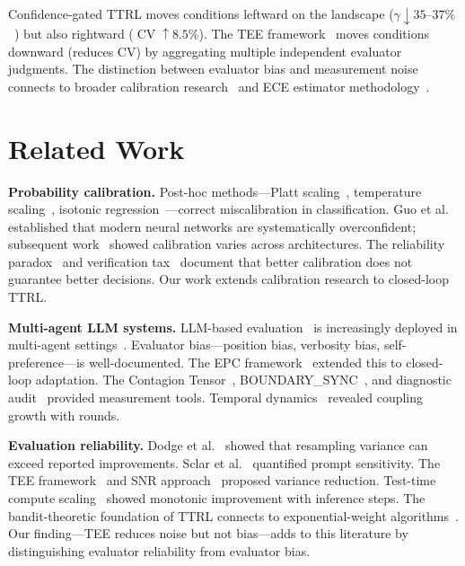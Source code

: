 \documentclass[11pt]{article}
\DeclareMathOperator{\CV}{CV}
\begin{document}
Confidence-gated TTRL moves conditions leftward on the landscape ($\gamma \downarrow 35$--$37\%$~\cite{liu2026caleffects}) but also rightward ($\CV \uparrow 8.5\%$). The TEE framework~\cite{messing2026tee} moves conditions downward (reduces CV) by aggregating multiple independent evaluator judgments. The distinction between evaluator bias and measurement noise connects to broader calibration research~\cite{guo2017calibration,niculescu2005predicting,kull2017temperature} and ECE estimator methodology~\cite{kumar2019verified,nixon2019measuring,roelofs2022mitigating}.

\section{Related Work}

\textbf{Probability calibration.} Post-hoc methods---Platt scaling~\cite{platt1999probabilistic}, temperature scaling~\cite{kull2017temperature}, isotonic regression~\cite{niculescu2005predicting}---correct miscalibration in classification. Guo et al.~\cite{guo2017calibration} established that modern neural networks are systematically overconfident; subsequent work~\cite{minderer2021revisiting,wang2021revisiting} showed calibration varies across architectures. The reliability paradox~\cite{he2026paradox} and verification tax~\cite{mills2026verification} document that better calibration does not guarantee better decisions. Our work extends calibration research to closed-loop TTRL.

\textbf{Multi-agent LLM systems.} LLM-based evaluation~\cite{zheng2023judging,chiang2024chatbot} is increasingly deployed in multi-agent settings~\cite{li2023camel,wu2024autogen}. Evaluator bias---position bias, verbosity bias, self-preference---is well-documented. The EPC framework~\cite{liu2026epc} extended this to closed-loop adaptation. The Contagion Tensor~\cite{liu2026tensor}, BOUNDARY\_SYNC~\cite{liu2026boundarysync}, and diagnostic audit~\cite{liu2026audit} provided measurement tools. Temporal dynamics~\cite{liu2026temporal} revealed coupling growth with rounds.

\textbf{Evaluation reliability.} Dodge et al.~\cite{dodge2019reproducibility} showed that resampling variance can exceed reported improvements. Sclar et al.~\cite{sclar2024quantifying} quantified prompt sensitivity. The TEE framework~\cite{messing2026tee} and SNR approach~\cite{heineman2025snr} proposed variance reduction. Test-time compute scaling~\cite{snell2024scaling} showed monotonic improvement with inference steps. The bandit-theoretic foundation of TTRL connects to exponential-weight algorithms~\cite{bubeck2012regret}. Our finding---TEE reduces noise but not bias---adds to this literature by distinguishing evaluator reliability from evaluator bias.
\end{document}
